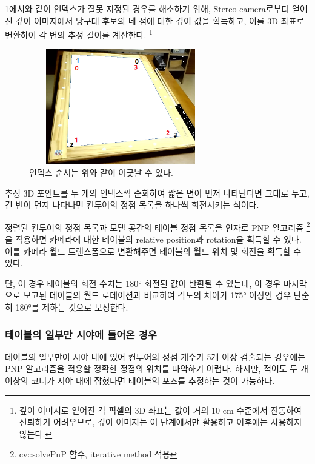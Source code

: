 \documentclass[10pt]{oblivoir}
\begin{document}
\newpage

\cref{fig;pool-table-invalid-index}에서와 같이 인덱스가 잘못 지정된 경우를 해소하기 위해, Stereo camera로부터 얻어진 깊이 이미지에서 당구대 후보의 네 점에 대한 깊이 값을 획득하고, 이를 3D 좌표로 변환하여 각 변의 추정 길이를 계산한다.
\footnote{깊이 이미지로 얻어진 각 픽셀의 3D 좌표는 값이 거의 10 cm 수준에서 진동하여 신뢰하기 어려우므로, 깊이 이미지는 이 단계에서만 활용하고 이후에는 사용하지 않는다.}

\begin{figure}[ht]
    \begin{center}
        \includegraphics[width=8cm, height=5cm, keepaspectratio]{img/billiards-table-indexes.png}
    \end{center}
    \caption{인덱스 순서는 위와 같이 어긋날 수 있다.}
    \label{fig;pool-table-invalid-index}
\end{figure}

추정 3D 포인트를 두 개의 인덱스씩 순회하여 짧은 변이 먼저 나타난다면 그대로 두고, 긴 변이 먼저 나타나면 컨투어의 정점 목록을 하나씩 회전시키는 식이다.

정렬된 컨투어의 정점 목록과 모델 공간의 테이블 정점 목록을 인자로 PNP 알고리즘
\footnote{cv::solvePnP 함수, iterative method 적용}
을 적용하면 카메라에 대한 테이블의 relative position과 rotation을 획득할 수 있다. 이를 카메라 월드 트랜스폼으로 변환해주면 테이블의 월드 위치 및 회전을 획득할 수 있다.

단, 이 경우 테이블의 회전 수치는 180\si{\degree} 회전된 값이 반환될 수 있는데, 이 경우 마지막으로 보고된 테이블의 월드 로테이션과 비교하여 각도의 차이가 175\si{\degree} 이상인 경우 단순히 180\si{\degree}를 제하는 것으로 보정한다.

\subsubsection{테이블의 일부만 시야에 들어온 경우}

테이블의 일부만이 시야 내에 있어 컨투어의 정점 개수가 5개 이상 검출되는 경우에는 PNP 알고리즘을 적용할 정확한 정점의 위치를 파악하기 어렵다. 하지만, 적어도 두 개 이상의 코너가 시야 내에 잡혔다면 테이블의 포즈를 추정하는 것이 가능하다.
\end{document}
